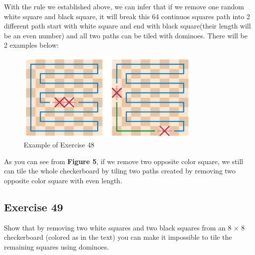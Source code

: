 \documentclass{article}
\begin{document}
With the rule we established above, we can infer that if we remove one random 
white square and black square, it will break this 64 continuos squares path into
2 different path start with white square and end with black square(their length will
be an even number) and all two paths can be tiled with dominoes. There will be
2 examples below:
\clearpage
\begin{figure}
    \begin{center}
        \includegraphics[width = 0.8\textwidth]{GomoryTheorem-01.png}
        \caption{Example of Exercise 48}
    \end{center}
\end{figure}
As you can see from \textbf{Figure 5}, if we remove two opposite color square,
we still can tile the whole checkerboard by tiling two paths created by 
removing two opposite color square with even length.
\subsection*{Exercise 49}
Show that by removing two white squares and two black squares from an 
8 \(\times\) 8 checkerboard (colored as in the text) you can make it 
impossible to tile the remaining squares using dominoes.
\end{document}
